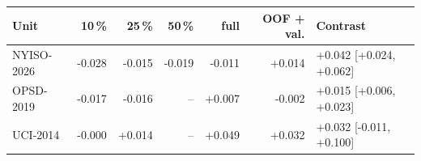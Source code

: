 \begin{tabular}{@{}l r r r r r l@{}}\toprule
Unit & 10\,\% & 25\,\% & 50\,\% & full & OOF + val. & Contrast \\\midrule
NYISO-2026 & -0.028 & -0.015 & -0.019 & -0.011 & +0.014 & +0.042 [+0.024, +0.062] \\
OPSD-2019 & -0.017 & -0.016 & -- & +0.007 & -0.002 & +0.015 [+0.006, +0.023] \\
UCI-2014 & -0.000 & +0.014 & -- & +0.049 & +0.032 & +0.032 [-0.011, +0.100] \\
\bottomrule\end{tabular}
